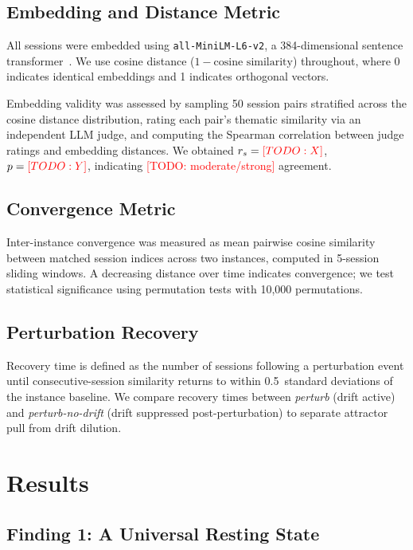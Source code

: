 \documentclass{article}
\newcommand{\todo}[1]{\textcolor{red}{[TODO: #1]}}
\begin{document}
\subsection{Embedding and Distance Metric}

All sessions were embedded using \texttt{all-MiniLM-L6-v2}, a 384-dimensional
sentence transformer~\citep{reimers2019}. We use cosine distance ($1 -
\text{cosine similarity}$) throughout, where 0 indicates identical embeddings
and 1 indicates orthogonal vectors.

Embedding validity was assessed by sampling 50 session pairs stratified across
the cosine distance distribution, rating each pair's thematic similarity via an
independent LLM judge, and computing the Spearman correlation between judge
ratings and embedding distances. We obtained $r_s = \todo{X}$, $p =
\todo{Y}$, indicating \todo{moderate/strong} agreement.

\subsection{Convergence Metric}

Inter-instance convergence was measured as mean pairwise cosine similarity
between matched session indices across two instances, computed in 5-session
sliding windows. A decreasing distance over time indicates convergence; we test
statistical significance using permutation tests with 10{,}000 permutations.

\subsection{Perturbation Recovery}

Recovery time is defined as the number of sessions following a perturbation
event until consecutive-session similarity returns to within 0.5~standard
deviations of the instance baseline. We compare recovery times between
\emph{perturb} (drift active) and \emph{perturb-no-drift} (drift suppressed
post-perturbation) to separate attractor pull from drift dilution.

\section{Results}
\label{sec:results}

\subsection{Finding 1: A Universal Resting State}
\label{sec:finding1}
\end{document}
